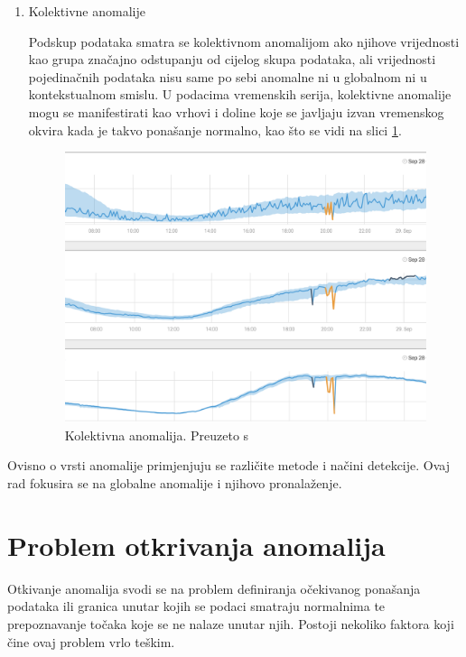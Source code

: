 \documentclass[utf8, diplomski, numeric]{fer}
\begin{document}
\begin{enumerate}
\item Kolektivne anomalije

Podskup podataka smatra se kolektivnom anomalijom ako njihove vrijednosti kao grupa značajno odstupanju od cijelog skupa podataka, ali vrijednosti pojedinačnih podataka nisu same po sebi anomalne ni u globalnom ni u kontekstualnom smislu. U podacima vremenskih serija, kolektivne anomalije mogu se manifestirati kao vrhovi i doline koje se javljaju izvan vremenskog okvira kada je takvo ponašanje normalno, kao što se vidi na slici \ref{fig:outlier3}.

\begin{figure}[htb]
\includegraphics[width=1\textwidth]{images/outlier_type3.png}
\centering
\caption{Kolektivna anomalija. Preuzeto s  \cite{OutlierAnalysis}}
\label{fig:outlier3}
\end{figure}
\end{enumerate}

Ovisno o vrsti anomalije primjenjuju se različite metode i načini detekcije. Ovaj rad fokusira se na globalne anomalije i njihovo pronalaženje.

\section{Problem otkrivanja anomalija}
Otkivanje anomalija svodi se na problem definiranja očekivanog ponašanja podataka ili granica unutar kojih se podaci smatraju normalnima te prepoznavanje točaka koje se ne nalaze unutar njih. Postoji nekoliko faktora koji čine ovaj problem vrlo teškim.
\end{document}
